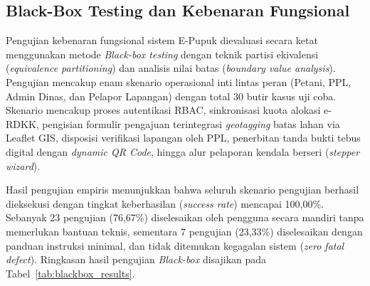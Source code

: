 \documentclass[conference]{IEEEtran}
\begin{document}
\subsection{Black-Box Testing dan Kebenaran Fungsional}
Pengujian kebenaran fungsional sistem E-Pupuk dievaluasi secara ketat menggunakan metode \textit{Black-box testing} dengan teknik partisi ekivalensi (\textit{equivalence partitioning}) dan analisis nilai batas (\textit{boundary value analysis}). Pengujian mencakup enam skenario operasional inti lintas peran (Petani, PPL, Admin Dinas, dan Pelapor Lapangan) dengan total 30 butir kasus uji coba. Skenario mencakup proses autentikasi RBAC, sinkronisasi kuota alokasi e-RDKK, pengisian formulir pengajuan terintegrasi \textit{geotagging} batas lahan via Leaflet GIS, disposisi verifikasi lapangan oleh PPL, penerbitan tanda bukti tebus digital dengan \textit{dynamic QR Code}, hingga alur pelaporan kendala berseri (\textit{stepper wizard}).

Hasil pengujian empiris menunjukkan bahwa seluruh skenario pengujian berhasil dieksekusi dengan tingkat keberhasilan (\textit{success rate}) mencapai 100,00\%. Sebanyak 23 pengujian (76,67\%) diselesaikan oleh pengguna secara mandiri tanpa memerlukan bantuan teknis, sementara 7 pengujian (23,33\%) diselesaikan dengan panduan instruksi minimal, dan tidak ditemukan kegagalan sistem (\textit{zero fatal defect}). Ringkasan hasil pengujian \textit{Black-box} disajikan pada Tabel~\ref{tab:blackbox_results}.

\begin{table}[htbp]
\caption{Rekapitulasi Pengujian Fungsional Black-Box Testing}
\begin{center}
\label{tab:blackbox_results}
\end{center}
\end{table}
\end{document}
